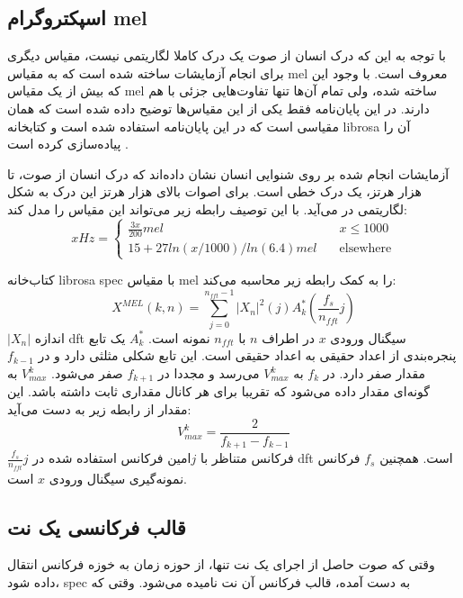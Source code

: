 \subsection{اسپکتروگرام mel}
با توجه به این که درک انسان از صوت یک درک کاملا لگاریتمی نیست، مقیاس دیگری برای
انجام آزمایشات ساخته شده است که به مقیاس mel معروف است. با وجود این که بیش از یک
مقیاس mel ساخته شده، ولی تمام آن‌ها تنها تفاوت‌هایی جزئی با هم دارند. در این
پایان‌نامه فقط یکی از این مقیاس‌ها توضیح داده شده است که همان مقیاسی است که در
این پایان‌نامه استفاده شده است و کتابخانه librosa آن را پیاده‌سازی کرده است
\cite{mcfee2015librosa}.

آزمایشات انجام شده بر روی شنوایی انسان نشان داده‌اند که درک انسان از صوت، تا
هزار هرتز، یک درک خطی است. برای اصوات بالای هزار هرتز این درک به شکل لگاریتمی در
می‌آید. با این توصیف رابطه زیر می‌تواند این مقیاس را مدل کند:
\begin{equation}
    x Hz =
    \begin{cases}
        \frac{3x}{200}mel &\quad x \leq 1000\\
        15 + 27 ln(x/1000) / ln(6.4) mel &\quad \text{elsewhere}
    \end{cases}
\end{equation}

کتاب‌خانه librosa \gls{spec} با مقیاس mel را به کمک رابطه زیر محاسبه می‌کند:
\begin{equation}
    X^{MEL}(k, n) = \sum_{j=0}^{n_{fft}-1} |X_n|^2(j)A_k^*(\frac{f_s}{n_{fft}}j)
\end{equation}
$|X_n|$ اندازه \gls{dft} سیگنال ورودی $x$ در اطراف $n$ با $n_{fft}$ نمونه است.
$A_k^*$ یک تابع پنجره‌بندی از اعداد حقیقی به اعداد حقیقی است. این تابع شکلی
مثلثی دارد و در $f_{k-1}$ مقدار صفر دارد. در $f_k$ به $V_{max}^{k}$ می‌رسد و
مجددا در $f_{k+1}$ صفر می‌شود. $V_{max}^{k}$ به گونه‌ای مقدار داده می‌شود که
تقریبا برای هر کانال مقداری ثابت داشته باشد. این مقدار از رابطه زیر به دست
می‌آید:
\begin{equation}
    V_{max}^{k} = \frac{2}{f_{k+1} - f_{k-1}}
\end{equation}
$\frac{f_s}{n_{fft}}j$ فرکانس متناظر با $j$امین فرکانس استفاده شده در \gls{dft}
است. همچنین $f_s$ فرکانس نمونه‌گیری سیگنال ورودی $x$ است.

\subsection{قالب فرکانسی یک نت}
وقتی که صوت حاصل از اجرای یک نت تنها، از حوزه زمان به خوزه فرکانس انتقال داده
شود، \gls{spec} به دست آمده، قالب فرکانس آن نت نامیده می‌شود. وقتی که

